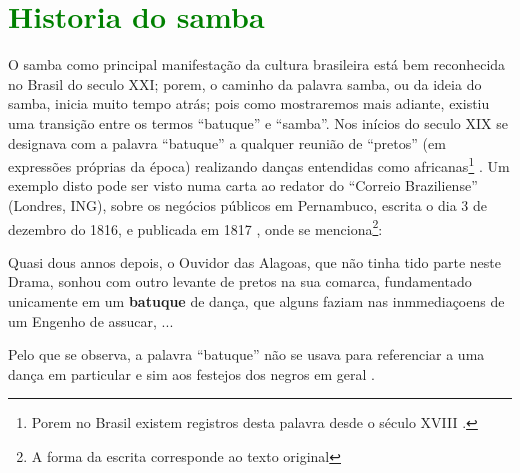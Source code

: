 \section{\textcolor{green}{Historia do samba}}
O samba como principal manifestação da cultura brasileira está bem reconhecida no Brasil do seculo XXI;
porem, o caminho da palavra samba, ou da ideia do samba, inicia muito tempo atrás;
pois como mostraremos mais adiante, existiu uma transição entre os termos ``batuque'' e ``samba''.
Nos inícios do seculo XIX
se designava com a palavra ``batuque''  a qualquer reunião de ``pretos'' (em expressões próprias da época) realizando danças entendidas como africanas\footnote{
Porem no Brasil existem registros desta palavra desde o século XVIII \cite[pp. 85]{sandroni2001feitico}. }
\cite[pp. 54]{de4danccas} \cite[pp. 73]{lara2007memoria}.
Um exemplo disto pode ser visto numa carta ao redator do ``Correio Braziliense''  (Londres, ING),
sobre os negócios públicos em Pernambuco,
escrita o dia 3 de dezembro do 1816, e publicada em 1817 \cite[pp. 468]{batuqueBraziliense},
onde se menciona\footnote{\label{footort}A forma da escrita corresponde ao texto original}:
\begin{tcolorbox}[breakable,colback=colorlowgray,colframe=colorlowgray]%
Quasi dous annos depois, o Ouvidor das Alagoas, que não tinha tido parte neste Drama,
sonhou com outro levante de pretos na sua comarca, 
fundamentado unicamente em um \textbf{batuque} de dança, 
que alguns faziam nas inmmediaçoens de um Engenho de assucar, ...
\end{tcolorbox} 
Pelo que se observa, 
a palavra ``batuque'' não se usava para referenciar a uma dança em particular e sim aos festejos dos negros em geral \cite[pp. 85]{sandroni2001feitico}.

\PRLsep{*}

